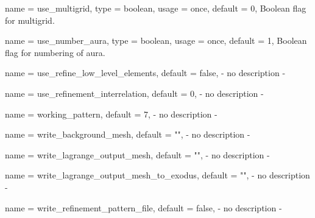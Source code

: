 \begin{parameter}{
    name    = {use_multigrid},
    type    = {boolean},
    usage   = {once},
    default = {0},
}
Boolean flag for multigrid.
\end{parameter}

\begin{parameter}{
    name    = {use_number_aura},
    type    = {boolean},
    usage   = {once},
    default = {1},
}
Boolean flag for numbering of aura.
\end{parameter}

\begin{parameter}{
    name    = {use_refine_low_level_elements},
    default = {false},
}
- no description -
\end{parameter}

\begin{parameter}{
    name    = {use_refinement_interrelation},
    default = {0},
}
- no description -
\end{parameter}

\begin{parameter}{
    name    = {working_pattern},
    default = {7},
}
- no description -
\end{parameter}

\begin{parameter}{
    name    = {write_background_mesh},
    default = {""},
}
- no description -
\end{parameter}

\begin{parameter}{
    name    = {write_lagrange_output_mesh},
    default = {""},
}
- no description -
\end{parameter}

\begin{parameter}{
    name    = {write_lagrange_output_mesh_to_exodus},
    default = {""},
}
- no description -
\end{parameter}

\begin{parameter}{
    name    = {write_refinement_pattern_file},
    default = {false},
}
- no description -
\end{parameter}

